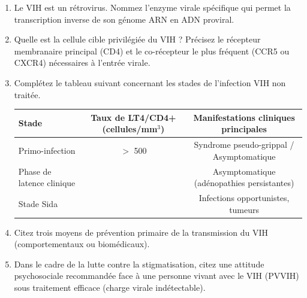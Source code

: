 \documentclass[11pt]{article}
\begin{document}
\begin{exercice}
\begin{enumerate}
    \item Le VIH est un rétrovirus. Nommez l'enzyme virale spécifique qui permet la transcription inverse de son génome ARN en ADN proviral.
    \item Quelle est la cellule cible privilégiée du VIH ? Précisez le récepteur membranaire principal (CD4) et le co-récepteur le plus fréquent (CCR5 ou CXCR4) nécessaires à l'entrée virale.
    \item Complétez le tableau suivant concernant les stades de l'infection VIH non traitée.
    \begin{tabularx}{\linewidth}{|X|c|c|}
    \hline
    \textbf{Stade} & \textbf{Taux de LT4/CD4+ (cellules/mm$^3$)} & \textbf{Manifestations cliniques principales} \\
    \hline
    Primo-infection & $>$ 500 & Syndrome pseudo-grippal / Asymptomatique \\
    \hline
    Phase de latence clinique & & Asymptomatique (adénopathies persistantes) \\
    \hline
    Stade Sida & & Infections opportunistes, tumeurs \\
    \hline
    \end{tabularx}
    \item Citez trois moyens de prévention primaire de la transmission du VIH (comportementaux ou biomédicaux).
    \item Dans le cadre de la lutte contre la stigmatisation, citez une attitude psychosociale recommandée face à une personne vivant avec le VIH (PVVIH) sous traitement efficace (charge virale indétectable).
\end{enumerate}
\end{exercice}
\end{document}
